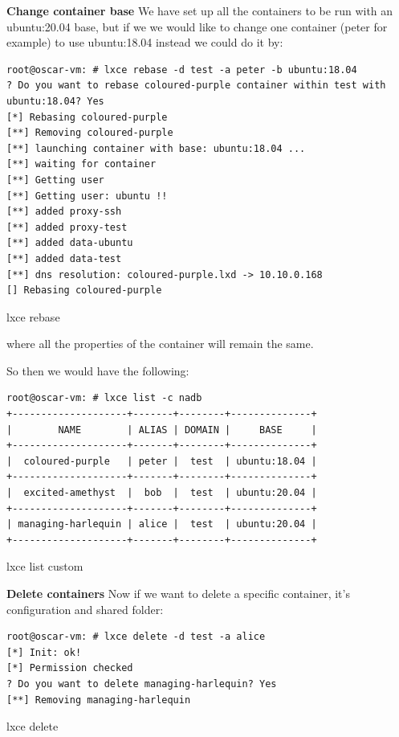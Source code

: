 \textbf{Change container base}
We have set up all the containers to be run with an ubuntu:20.04 base, but if we we would like to change one container (peter for example) to use ubuntu:18.04 instead we could do it by:
\begin{listing}[H]
\begin{verbatim}
root@oscar-vm: # lxce rebase -d test -a peter -b ubuntu:18.04
? Do you want to rebase coloured-purple container within test with ubuntu:18.04? Yes
[*] Rebasing coloured-purple
[**] Removing coloured-purple
[**] launching container with base: ubuntu:18.04 ...
[**] waiting for container
[**] Getting user
[**] Getting user: ubuntu !!
[**] added proxy-ssh
[**] added proxy-test
[**] added data-ubuntu
[**] added data-test
[**] dns resolution: coloured-purple.lxd -> 10.10.0.168
[] Rebasing coloured-purple
\end{verbatim}
\caption[lxce rebase]{\footnotesize{lxce rebase}}
\end{listing}
where all the properties of the container will remain the same.

So then we would have the following:
\begin{listing}[H]
\begin{verbatim}
root@oscar-vm: # lxce list -c nadb
+--------------------+-------+--------+--------------+
|        NAME        | ALIAS | DOMAIN |     BASE     |
+--------------------+-------+--------+--------------+
|  coloured-purple   | peter |  test  | ubuntu:18.04 |
+--------------------+-------+--------+--------------+
|  excited-amethyst  |  bob  |  test  | ubuntu:20.04 |
+--------------------+-------+--------+--------------+
| managing-harlequin | alice |  test  | ubuntu:20.04 |
+--------------------+-------+--------+--------------+
\end{verbatim}
\caption[lxce list custom]{\footnotesize{lxce list custom}}
\end{listing}

\textbf{Delete containers}
Now if we want to delete a specific container, it's configuration and shared folder:

\begin{listing}[H]
\begin{verbatim}
root@oscar-vm: # lxce delete -d test -a alice
[*] Init: ok!
[*] Permission checked
? Do you want to delete managing-harlequin? Yes
[**] Removing managing-harlequin
\end{verbatim}
\caption[lxce delete]{\footnotesize{lxce delete}}
\end{listing}

